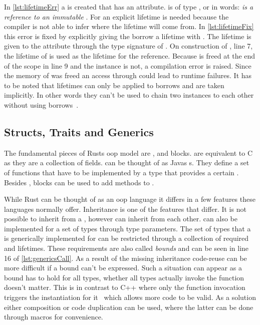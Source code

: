 \documentclass[thesis]{subfiles}
\begin{document}
    In \autoref{lst:lifetimeErr} a \struct \Foo is created that has an attribute.
     is of type , or in words: \emph{ is a reference to an immutable \String}.
    For  an explicit lifetime is needed because the compiler is not able to infer where the lifetime will come from.
    In \autoref{lst:lifetimeFix} this error is fixed by explicitly giving the borrow a lifetime with .
    The lifetime is given to the attribute through the type signature of \Foo.
    On construction of \Foo, line 7, the lifetime of  is used as the lifetime for the reference.
    Because  is freed at the end of the scope in line 9 and the \Foo instance is not, a compilation error is raised.
    Since the memory of  was freed an access through  could lead to runtime failures.
    It has to be noted that lifetimes can only be applied to borrows and are taken implicitly.
    In other words they can't be used to chain two instances to each other without using borrows~\autocite[PhantomData]{rust-doc}.

  \subsection{Structs, Traits and Generics}\label{sec:stg}
    The fundamental pieces of Rusts \gls{oop} model are \structs, \traits and  blocks.
    \structs are equivalent to C \structs as they are a collection of fields.
    \traits can be thought of as Javas s.
    They define a set of functions that have to be implemented by a type that provides a certain \trait.
    Besides \traits,  blocks can be used to add methods to \structs.

    While Rust can be thought of as an \gls{oop} language it differs in a few features these languages normally offer.
    Inheritance is one of the features that differ.
    It is not possible to inherit from a \struct, \traits however can inherit from each other.
    \traits can also be implemented for a set of types through type parameters.
    The set of types that a \trait is generically implemented for can be restricted through a collection of required \traits and lifetimes.
    These requirements are also called \emph{bounds} and can be seen in line 16 of \autoref{lst:genericsCall}.
    As a result of the missing inheritance code-reuse can be more difficult if a bound can't be expressed.
    Such a situation can appear as a bound has to hold for all types, whether all types actually invoke the function doesn't matter.
    This is in contrast to C++ where only the function invocation triggers the instantiation for it~\autocite[§17.8.1 10]{cpp-iso} which allows more code to be valid.
    As a solution either composition or code duplication can be used, where the latter can be done through macros for convenience.%
    ~\autocite[10. Generic Types, Traits, and Lifetimes, 17. Object Oriented Programming Features of Rust]{rust-book}
\end{document}
